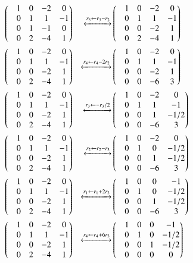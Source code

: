 \documentclass[journal,12pt,twocolumn]{IEEEtran}
\begin{document}
\begin{align}
 & \begin{pmatrix}&1 &0 &-2 &0 \\ &0 &1 &1 &-1 \\ &0 &1 &-1 &0 \\&0 &2 &-4 &1\end{pmatrix}  &\xleftrightarrow[]{r_3 \leftarrow r_3 - r_2} &\begin{pmatrix}&1 &0 &-2 &0 \\ &0 &1 &1 &-1 \\ &0 &0 &-2 &1 \\&0 &2 &-4 &1\end{pmatrix} \\
 &\begin{pmatrix}&1 &0 &-2 &0 \\ &0 &1 &1 &-1 \\ &0 &0 &-2 &1 \\&0 &2 &-4 &1\end{pmatrix} 
 &\xleftrightarrow[]{r_4 \leftarrow r_4 - 2r_2 } &\begin{pmatrix}&1 &0 &-2 &0 \\ &0 &1 &1 &-1 \\ &0 &0 &-2 &1 \\&0 &0 &-6&3\end{pmatrix}\\
 &\begin{pmatrix}&1 &0 &-2 &0 \\ &0 &1 &1 &-1 \\ &0 &0 &-2 &1 \\&0 &2 &-4 &1\end{pmatrix} &\xleftrightarrow[]{r_3 \leftarrow -r_3/2 } &\begin{pmatrix}&1 &0 &-2 &0 \\ &0 &1 &1 &-1 \\ &0 &0 &1 &-1/2 \\&0 &0 &-6 &3\end{pmatrix}\\
 &\begin{pmatrix}&1 &0 &-2 &0 \\ &0 &1 &1 &-1 \\ &0 &0 &-2 &1 \\&0 &2 &-4 &1\end{pmatrix} 
 &\xleftrightarrow[]{r_2 \leftarrow r_2 - r_3 } &\begin{pmatrix}&1 &0 &-2 &0 \\ &0 &1 &0 &-1/2 \\ &0 &0 &1 &-1/2 \\&0 &0 &-6 &3\end{pmatrix} \\
 &\begin{pmatrix}&1 &0 &-2 &0 \\ &0 &1 &1 &-1 \\ &0 &0 &-2 &1 \\&0 &2 &-4 &1\end{pmatrix} 
 &\xleftrightarrow[]{r_1 \leftarrow r_1 + 2r_3 } &\begin{pmatrix}&1 &0 &0 &-1 \\ &0 &1 &0 &-1/2 \\ &0 &0 &1 &-1/2 \\&0 &0 &-6 &3\end{pmatrix} \\
 &\begin{pmatrix}&1 &0 &-2 &0 \\ &0 &1 &1 &-1 \\ &0 &0 &-2 &1 \\&0 &2 &-4 &1\end{pmatrix} 
 &\xleftrightarrow[]{r_4 \leftarrow r_4 + 6r_3 } &\begin{pmatrix}&1 &0 &0 &-1 \\ &0 &1 &0 &-1/2 \\ &0 &0 &1 &-1/2 \\&0 &0 &0 &0\end{pmatrix} \label{7}
\end{align}
\end{document}
